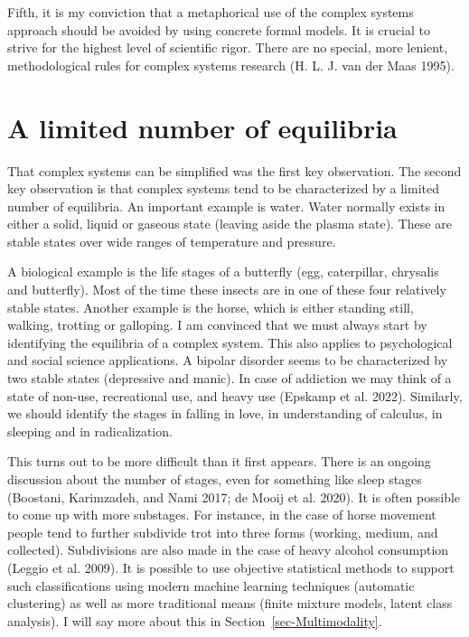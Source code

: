 \documentclass[
  a4paper,
  DIV=11,
  numbers=noendperiod,
  oneside]{scrreprt}
\begin{document}
Fifth, it is my conviction that a metaphorical use of the complex
systems approach should be avoided by using concrete formal models. It
is crucial to strive for the highest level of scientific rigor. There
are no special, more lenient, methodological rules for complex systems
research (H. L. J. van der Maas 1995).

\hypertarget{sec-A-limited-number-of-equilibria}{%
\section{A limited number of
equilibria}\label{sec-A-limited-number-of-equilibria}}

That complex systems can be simplified was the first key observation.
The second key observation is that complex systems tend to be
characterized by a limited number of equilibria. An important example is
water. Water normally exists in either a solid, liquid or gaseous state
(leaving aside the plasma state). These are stable states over wide
ranges of temperature and pressure.

A biological example is the life stages of a butterfly (egg,
caterpillar, chrysalis and butterfly). Most of the time these insects
are in one of these four relatively stable states. Another example is
the horse, which is either standing still, walking, trotting or
galloping. I am convinced that we must always start by identifying the
equilibria of a complex system. This also applies to psychological and
social science applications. A bipolar disorder seems to be
characterized by two stable states (depressive and manic). In case of
addiction we may think of a state of non-use, recreational use, and
heavy use (Epskamp et al. 2022). Similarly, we should identify the
stages in falling in love, in understanding of calculus, in sleeping and
in radicalization.

This turns out to be more difficult than it first appears. There is an
ongoing discussion about the number of stages, even for something like
sleep stages (Boostani, Karimzadeh, and Nami 2017; de Mooij et al.
2020). It is often possible to come up with more substages. For
instance, in the case of horse movement people tend to further subdivide
trot into three forms (working, medium, and collected). Subdivisions are
also made in the case of heavy alcohol consumption (Leggio et al. 2009).
It is possible to use objective statistical methods to support such
classifications using modern machine learning techniques (automatic
clustering) as well as more traditional means (finite mixture models,
latent class analysis). I will say more about this in
Section~\ref{sec-Multimodality}.
\end{document}
